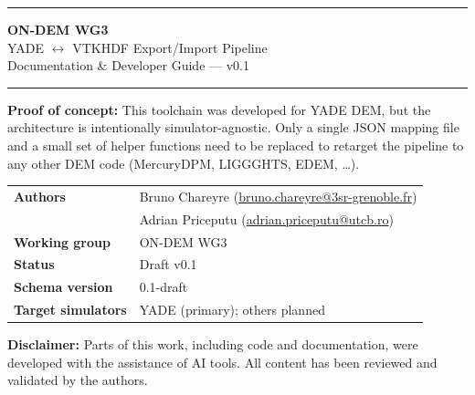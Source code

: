 \documentclass[11pt,a4paper]{article}
\begin{document}
\begin{titlepage}
\centering
\vspace*{2cm}

{\color{PurpleMid}\rule{\linewidth}{1.5pt}}
\vspace{0.4cm}

{\Huge\sffamily\bfseries\color{PurpleDark} ON-DEM WG3}\\[0.4em]
{\LARGE\sffamily\color{TealDark} YADE $\leftrightarrow$ VTKHDF Export/Import Pipeline}\\[0.3em]
{\large\sffamily\color{GrayMid} Documentation \& Developer Guide — v0.1}

\vspace{0.4cm}
{\color{PurpleMid}\rule{\linewidth}{1.5pt}}
\vspace{1.5cm}

\begin{tcolorbox}[colback=PurpleLight, colframe=PurpleMid, arc=6pt,
  boxrule=0.6pt, width=0.82\textwidth]
\centering\sffamily\small\color{PurpleDark}
\textbf{Proof of concept:} This toolchain was developed for YADE DEM, but the
architecture is intentionally simulator-agnostic. Only a single JSON mapping
file and a small set of helper functions need to be replaced to retarget the
pipeline to any other DEM code (MercuryDPM, LIGGGHTS, EDEM, \ldots).
\end{tcolorbox}

\vspace{1.5cm}

\begin{tabular}{ll}
\toprule
\sffamily\textbf{Authors}          & Bruno Chareyre (\href{mailto:bruno.chareyre@3sr-grenoble.fr}{bruno.chareyre@3sr-grenoble.fr}) \\
                                   & Adrian Priceputu (\href{mailto:adrian.priceputu@utcb.ro}{adrian.priceputu@utcb.ro}) \\
\sffamily\textbf{Working group}    & ON-DEM WG3 \\
\sffamily\textbf{Status}           & Draft v0.1 \\
\sffamily\textbf{Schema version}   & 0.1-draft \\
\sffamily\textbf{Target simulators}& YADE (primary); others planned \\
\bottomrule
\end{tabular}



\vfill
\begin{tcolorbox}[colback=GrayLight, colframe=RuleLine, arc=4pt, boxrule=0.4pt]
\centering\small\sffamily\color{GrayMid}
\textbf{Disclaimer:} Parts of this work, including code and documentation, were
developed with the assistance of AI tools. All content has been reviewed and
validated by the authors.
\end{tcolorbox}

\end{titlepage}
\end{document}
